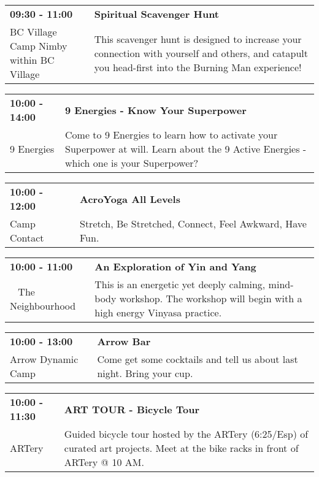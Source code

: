 \begin{tabular}{ p{1in} p{2.2in} }
    \textbf{09:30 - 11:00} & \textbf{Spiritual Scavenger Hunt} \\
    BC Village \newline Camp Nimby within BC Village & This scavenger hunt is designed to increase your connection with yourself and others, and catapult you head-first into the Burning Man experience! \\
    \hline 
\end{tabular}
    
\begin{tabular}{ p{1in} p{2.2in} }
    \textbf{10:00 - 14:00} & \textbf{9 Energies - Know Your Superpower} \\
    9 Energies \newline  & Come to 9 Energies to learn how to activate your Superpower at will. Learn about the 9 Active Energies - which one is your Superpower? \\
    \hline 
\end{tabular}
    
\begin{tabular}{ p{1in} p{2.2in} }
    \textbf{10:00 - 12:00} & \textbf{AcroYoga All Levels} \\
    Camp Contact \newline  & Stretch, Be Stretched, Connect, Feel Awkward, Have Fun. \\
    \hline 
\end{tabular}
    
\begin{tabular}{ p{1in} p{2.2in} }
    \textbf{10:00 - 11:00} & \textbf{ An Exploration of Yin and Yang } \\
    ~ \newline The Neighbourhood & This is an energetic yet deeply calming, mind-body workshop. The workshop will begin with a high energy Vinyasa practice. \\
    \hline 
\end{tabular}
    
\begin{tabular}{ p{1in} p{2.2in} }
    \textbf{10:00 - 13:00} & \textbf{Arrow Bar} \\
    Arrow Dynamic Camp \newline  & Come get some cocktails and tell us about last night. Bring your cup. \\
    \hline 
\end{tabular}
    
\begin{tabular}{ p{1in} p{2.2in} }
    \textbf{10:00 - 11:30} & \textbf{ART TOUR - Bicycle Tour} \\
    ARTery \newline  & Guided bicycle tour hosted by the ARTery (6:25/Esp) of curated art projects.   Meet at the bike racks in front of ARTery @ 10 AM. \\
    \hline 
\end{tabular}
    
